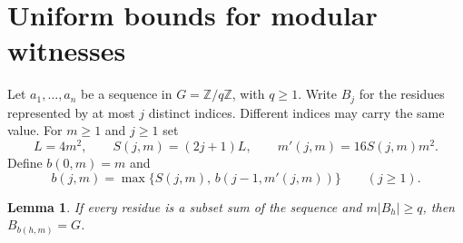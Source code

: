 \documentclass[11pt,reqno]{amsart}
\newtheorem{lemma}[theorem]{Lemma}
\theoremstyle{definition}
\theoremstyle{remark}
\begin{document}
\section{Uniform bounds for modular witnesses}\label{sec:modular}

Let \(a_1,\dots,a_n\) be a sequence in \(G=\mathbb Z/q\mathbb Z\),
with \(q\ge1\). Write \(B_j\) for the residues represented by at most
\(j\) distinct indices. Different indices may carry the same value.
For \(m\ge1\) and \(j\ge1\) set
\[
 L=4m^2,\qquad S(j,m)=(2j+1)L,\qquad m'(j,m)=16 S(j,m)m^2.
\]
Define \(b(0,m)=m\) and
\[
 b(j,m)=\max\{S(j,m),\, b(j-1,m'(j,m))\}\qquad(j\ge1).
\]

\begin{lemma}\label{lem:modular}
If every residue is a subset sum of the sequence and \(m|B_h|\ge q\),
then \(B_{b(h,m)}=G\).
\end{lemma}
\end{document}
